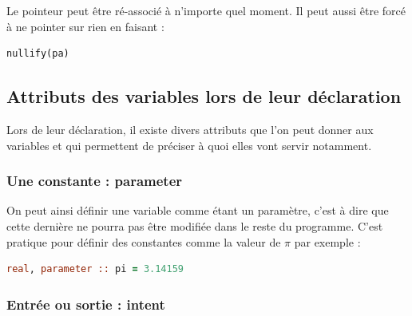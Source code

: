 \documentclass[a4paper,twoside]{article}
\begin{document}
\bigskip

Le pointeur peut être ré-associé à n'importe quel moment. Il peut aussi être forcé à ne pointer sur rien en faisant : 
\begin{verbatim}
nullify(pa)
\end{verbatim}

\subsection{Attributs des variables lors de leur déclaration}
Lors de leur déclaration, il existe divers attributs que l'on peut donner aux variables et qui permettent de préciser à quoi elles vont servir notamment. 

\subsubsection{Une constante : parameter}

On peut ainsi définir une variable comme étant un paramètre, c'est à dire que cette dernière ne pourra pas être modifiée dans le reste du programme. C'est pratique pour définir des constantes comme la valeur de $\pi$ par exemple : 
\begin{lstlisting}[language=Fortran]
real, parameter :: pi = 3.14159
\end{lstlisting}

\subsubsection{Entrée ou sortie : intent}
\end{document}
